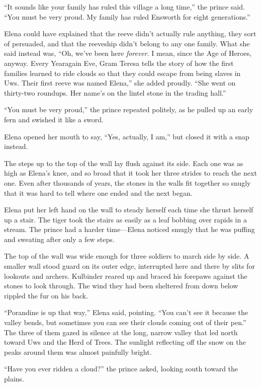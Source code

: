 \documentclass[10pt]{book}
\begin{document}
``It sounds like your family has ruled this village a long time,'' the prince said. ``You must be very proud. My family has ruled Ensworth for eight generations.''

Elena could have explained that the reeve didn't actually rule anything, they sort of persuaded, and that the reeveship didn't belong to any one family. What she said instead was, ``Oh, we've been here \emph{forever}. I mean, since the Age of Heroes, anyway. Every Yearagain Eve, Gram Teresa tells the story of how the first families learned to ride clouds so that they could escape from being slaves in Uws. Their first reeve was named Elena,'' she added proudly. ``She went on thirty-two roundups. Her name's on the lintel stone in the trading hall.''

``You must be very proud,'' the prince repeated politely, as he pulled up an early fern and swished it like a sword.

Elena opened her mouth to say, ``Yes, actually, I am,'' but closed it with a snap instead.

The steps up to the top of the wall lay flush against its side. Each one was as high as Elena's knee, and so broad that it took her three strides to reach the next one. Even after thousands of years, the stones in the walls fit together so snugly that it was hard to tell where one ended and the next began.

Elena put her left hand on the wall to steady herself each time she thrust herself up a stair. The tiger took the stairs as easily as a leaf bobbing over rapids in a stream. The prince had a harder time---Elena noticed smugly that he was puffing and sweating after only a few steps.

The top of the wall was wide enough for three soldiers to march side by side. A smaller wall stood guard on its outer edge, interrupted here and there by slits for lookouts and archers. Kulbinder reared up and braced his forepaws against the stones to look through. The wind they had been sheltered from down below rippled the fur on his back.

``Porandine is up that way,'' Elena said, pointing. ``You can't see it because the valley bends, but sometimes you can see their clouds coming out of their pen.'' The three of them gazed in silence at the long, narrow valley that led north toward Uws and the Herd of Trees. The sunlight reflecting off the snow on the peaks around them was almost painfully bright.

``Have you ever ridden a cloud?'' the prince asked, looking south toward the plains.
\end{document}
